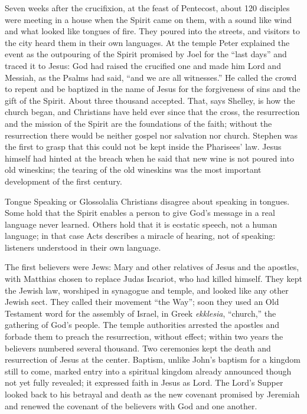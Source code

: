 Seven weeks after the crucifixion, at the feast of Pentecost, about 120 disciples were meeting in a
house when the Spirit came on them, with a sound like wind and what looked like tongues of fire. They
poured into the streets, and visitors to the city heard them in their own languages. At the temple
Peter explained the event as the outpouring of the Spirit promised by Joel for the ``last days'' and
traced it to Jesus: God had raised the crucified one and made him Lord and Messiah, as the Psalms had
said, ``and we are all witnesses.'' He called the crowd to repent and be baptized in the name of Jesus
for the forgiveness of sins and the gift of the Spirit. About three thousand accepted. That, says
Shelley, is how the church began, and Christians have held ever since that the cross, the resurrection
and the mission of the Spirit are the foundations of the faith; without the resurrection there would be neither gospel nor salvation nor church. Stephen was the first to grasp that this could not be kept inside
the Pharisees' law. Jesus himself had hinted at the breach when he said that new wine is not poured
into old wineskins; the tearing of the old wineskins was the most important development of the first
century.

\begin{sidebox}{Tongue Speaking or Glossolalia}
Christians disagree about speaking in tongues. Some hold that the Spirit enables a person to give God's
message in a real language never learned. Others hold that it is ecstatic speech, not a human language;
in that case Acts describes a miracle of hearing, not of speaking: listeners understood in their own
language.
\end{sidebox}

The first believers were Jews: Mary and other relatives of Jesus and the apostles, with Matthias chosen
to replace Judas Iscariot, who had killed himself. They kept the Jewish law, worshiped in synagogue and
temple, and looked like any other Jewish sect. They called their movement ``the Way''; soon they used
an Old Testament word for the assembly of Israel, in Greek \emph{ekklesia}, ``church,'' the gathering
of God's people. The temple authorities arrested the apostles and forbade them to preach the
resurrection, without effect; within two years the believers numbered several thousand. Two ceremonies
kept the death and resurrection of Jesus at the center. Baptism, unlike John's baptism for a kingdom
still to come, marked entry into a spiritual kingdom already announced though not yet fully revealed;
it expressed faith in Jesus as Lord. The Lord's Supper looked back to his betrayal and death as the
new covenant promised by Jeremiah and renewed the covenant of the believers with God and one another.

